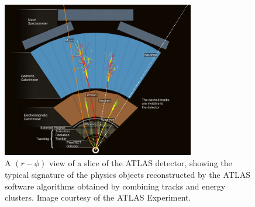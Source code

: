 \begin{figure}
\centering
\includegraphics[width=0.75\textwidth]{fig/particle_ID_patterns.png}
\caption{A $(r-\phi)$ view of a slice of the ATLAS detector, showing the typical signature of the physics objects reconstructed by the ATLAS software algorithms obtained by combining tracks and energy clusters. Image courtesy of the ATLAS Experiment.}
\label{fig:particle_id_patterns}
\end{figure}

